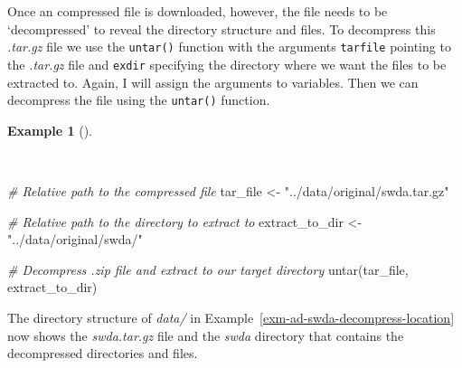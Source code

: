 \documentclass[
  letterpaper,
  DIV=11,
  numbers=noendperiod]{scrreport}
\newenvironment{Shaded}{\begin{snugshade}}{\end{snugshade}}
\newcommand{\CommentTok}[1]{\textcolor[rgb]{0.00,0.00,0.00}{\textit{#1}}}
\newcommand{\FunctionTok}[1]{\textcolor[rgb]{0.00,0.00,0.00}{#1}}
\newcommand{\NormalTok}[1]{\textcolor[rgb]{0.00,0.00,0.00}{#1}}
\newcommand{\OtherTok}[1]{\textcolor[rgb]{0.00,0.00,0.00}{#1}}
\newcommand{\StringTok}[1]{\textcolor[rgb]{0.00,0.00,0.00}{#1}}
\theoremstyle{definition}
\newtheorem{example}{Example}[chapter]
\theoremstyle{remark}
\begin{document}
Once an compressed file is downloaded, however, the file needs to be
`decompressed' to reveal the directory structure and files. To
decompress this \emph{.tar.gz} file we use the \texttt{untar()} function
with the arguments \texttt{tarfile} pointing to the \emph{.tar.gz} file
and \texttt{exdir} specifying the directory where we want the files to
be extracted to. Again, I will assign the arguments to variables. Then
we can decompress the file using the \texttt{untar()} function.

\begin{example}[]\protect\hypertarget{exm-ad-swda-decompress-file}{}\label{exm-ad-swda-decompress-file}

~

\begin{Shaded}
\begin{Highlighting}[]
\CommentTok{\# Relative path to the compressed file}
\NormalTok{tar\_file }\OtherTok{\textless{}{-}} \StringTok{"../data/original/swda.tar.gz"}

\CommentTok{\# Relative path to the directory to extract to}
\NormalTok{extract\_to\_dir }\OtherTok{\textless{}{-}} \StringTok{"../data/original/swda/"}

\CommentTok{\# Decompress .zip file and extract to our target directory}
\FunctionTok{untar}\NormalTok{(tar\_file, extract\_to\_dir)}
\end{Highlighting}
\end{Shaded}

\end{example}

The directory structure of \emph{data/} in
Example~\ref{exm-ad-swda-decompress-location} now shows the
\emph{swda.tar.gz} file and the \emph{swda} directory that contains the
decompressed directories and files.
\end{document}
